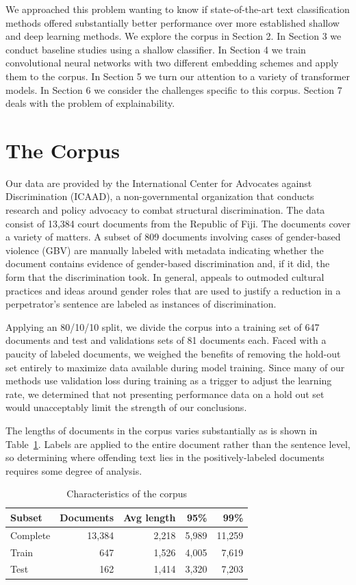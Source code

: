 \documentclass[twocolumn,10pt]{wmrDoc}
\begin{document}
We approached this problem wanting to know if state-of-the-art text classification methods offered substantially better performance over more established shallow and deep learning methods.  We explore the corpus in Section 2.  In Section 3 we conduct baseline studies using a shallow classifier.  In Section 4 we train convolutional neural networks with two different embedding schemes and apply them to the corpus.  In Section 5 we turn our attention to a variety of transformer models.  In Section 6 we consider the challenges specific to this corpus.  Section 7 deals with the problem of explainability.

\section{The Corpus}
Our data are provided by the International Center for Advocates against Discrimination (ICAAD), a non-governmental organization that conducts research and policy advocacy to combat structural discrimination. The data consist of 13,384 court documents from the Republic of Fiji. The documents cover a variety of matters. A subset of 809 documents involving cases of gender-based violence (GBV) are manually labeled with metadata indicating whether the document contains evidence of gender-based discrimination and, if it did, the form that the discrimination took. In general, appeals to outmoded cultural practices and ideas around gender roles that are used to justify a reduction in a perpetrator’s sentence are labeled as instances of discrimination.

Applying an 80/10/10 split, we divide the corpus into a training set of 647 documents and test and validations sets of 81 documents each.  Faced with a paucity of labeled documents, we weighed the benefits of removing the hold-out set entirely to maximize data available during model training.  Since many of our methods use validation loss during training as a trigger to adjust the learning rate, we determined that not presenting performance data on a hold out set would unacceptably limit the strength of our conclusions.

The lengths of documents in the corpus varies substantially as is shown in Table~\ref{tab:corpus}. Labels are applied to the entire document rather than the sentence level, so determining where offending text lies in the positively-labeled documents requires some degree of analysis.

\begin{table}
 \caption{Characteristics of the corpus}
  \centering
  \begin{tabular}{lrrrr}
    \toprule
    Subset   & Documents  & Avg length & 95\% & 99\%\\
    \midrule
    Complete & 13,384  & 2,218 & 5,989 & 11,259     \\
    Train    & 647  & 1,526 & 4,005 & 7,619      \\
    Test     & 162  & 1,414 & 3,320 & 7,203      \\
    \bottomrule
  \end{tabular}
  \label{tab:corpus}
\end{table}
\end{document}
